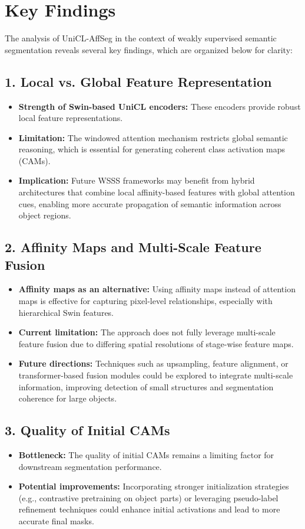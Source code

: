 \section{Key Findings}
\label{sec:key_findings}


The analysis of UniCL-AffSeg in the context of weakly supervised semantic segmentation reveals several key findings, which are organized below for clarity:

\subsection*{1. Local vs. Global Feature Representation}
\begin{itemize}
	\item \textbf{Strength of Swin-based UniCL encoders:} These encoders provide robust local feature representations.
	\item \textbf{Limitation:} The windowed attention mechanism restricts global semantic reasoning, which is essential for generating coherent class activation maps (CAMs).
	\item \textbf{Implication:} Future WSSS frameworks may benefit from hybrid architectures that combine local affinity-based features with global attention cues, enabling more accurate propagation of semantic information across object regions.
\end{itemize}

\subsection*{2. Affinity Maps and Multi-Scale Feature Fusion}
\begin{itemize}
	\item \textbf{Affinity maps as an alternative:} Using affinity maps instead of attention maps is effective for capturing pixel-level relationships, especially with hierarchical Swin features.
	\item \textbf{Current limitation:} The approach does not fully leverage multi-scale feature fusion due to differing spatial resolutions of stage-wise feature maps.
	\item \textbf{Future directions:} Techniques such as upsampling, feature alignment, or transformer-based fusion modules could be explored to integrate multi-scale information, improving detection of small structures and segmentation coherence for large objects.
\end{itemize}

\subsection*{3. Quality of Initial CAMs}
\begin{itemize}
	\item \textbf{Bottleneck:} The quality of initial CAMs remains a limiting factor for downstream segmentation performance.
	\item \textbf{Potential improvements:} Incorporating stronger initialization strategies (e.g., contrastive pretraining on object parts) or leveraging pseudo-label refinement techniques could enhance initial activations and lead to more accurate final masks.
\end{itemize}

